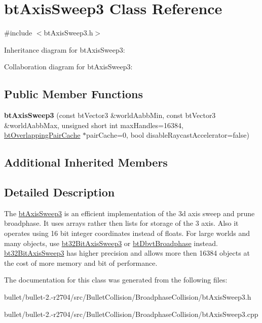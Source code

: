 \hypertarget{classbt_axis_sweep3}{\section{bt\+Axis\+Sweep3 Class Reference}
\label{classbt_axis_sweep3}
}


{\ttfamily \#include $<$bt\+Axis\+Sweep3.\+h$>$}



Inheritance diagram for bt\+Axis\+Sweep3\+:


Collaboration diagram for bt\+Axis\+Sweep3\+:
\subsection*{Public Member Functions}
\begin{DoxyCompactItemize}
\item 
\hypertarget{classbt_axis_sweep3_a7ccf0dc666f9a5506c309dc0359c2f09}{{\bfseries bt\+Axis\+Sweep3} (const bt\+Vector3 \&world\+Aabb\+Min, const bt\+Vector3 \&world\+Aabb\+Max, unsigned short int max\+Handles=16384, \hyperlink{classbt_overlapping_pair_cache}{bt\+Overlapping\+Pair\+Cache} $\ast$pair\+Cache=0, bool disable\+Raycast\+Accelerator=false)}\label{classbt_axis_sweep3_a7ccf0dc666f9a5506c309dc0359c2f09}

\end{DoxyCompactItemize}
\subsection*{Additional Inherited Members}


\subsection{Detailed Description}
The \hyperlink{classbt_axis_sweep3}{bt\+Axis\+Sweep3} is an efficient implementation of the 3d axis sweep and prune broadphase. It uses arrays rather then lists for storage of the 3 axis. Also it operates using 16 bit integer coordinates instead of floats. For large worlds and many objects, use \hyperlink{classbt32_bit_axis_sweep3}{bt32\+Bit\+Axis\+Sweep3} or \hyperlink{structbt_dbvt_broadphase}{bt\+Dbvt\+Broadphase} instead. \hyperlink{classbt32_bit_axis_sweep3}{bt32\+Bit\+Axis\+Sweep3} has higher precision and allows more then 16384 objects at the cost of more memory and bit of performance. 

The documentation for this class was generated from the following files\+:\begin{DoxyCompactItemize}
\item 
bullet/bullet-\/2.-\/r2704/src/\+Bullet\+Collision/\+Broadphase\+Collision/bt\+Axis\+Sweep3.\+h\item 
bullet/bullet-\/2.-\/r2704/src/\+Bullet\+Collision/\+Broadphase\+Collision/bt\+Axis\+Sweep3.\+cpp\end{DoxyCompactItemize}
